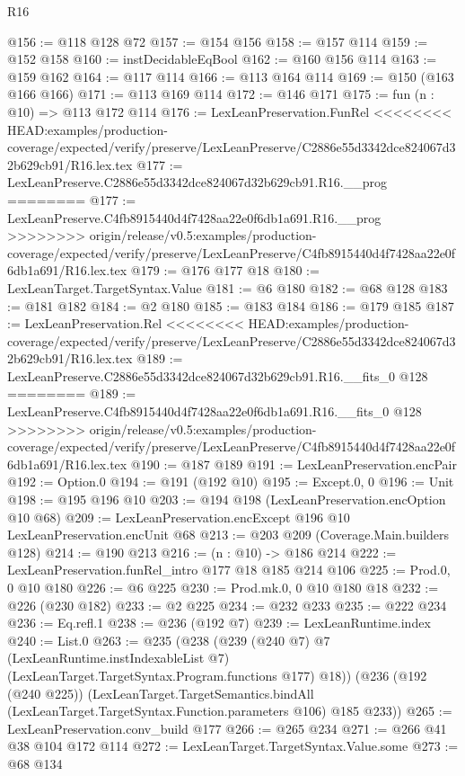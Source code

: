 \begin{lexlean}{R16}
\begin{coremodule}
{{{{{@156 := @118 @128 @72
@157 := @154 @156
@158 := @157 @114
@159 := @152 @158
@160 := instDecidableEqBool
@162 := @160 @156 @114
@163 := @159 @162
@164 := @117 @114
@166 := @113 @164 @114
@169 := @150 (@163 @166 @166)
@171 := @113 @169 @114
@172 := @146 @171
@175 := fun (n : @10) => @113 @172 @114
@176 := LexLeanPreservation.FunRel
<<<<<<<< HEAD:examples/production-coverage/expected/verify/preserve/LexLeanPreserve/C2886e55d3342dce824067d32b629cb91/R16.lex.tex
@177 := LexLeanPreserve.C2886e55d3342dce824067d32b629cb91.R16.__prog
========
@177 := LexLeanPreserve.C4fb8915440d4f7428aa22e0f6db1a691.R16.__prog
>>>>>>>> origin/release/v0.5:examples/production-coverage/expected/verify/preserve/LexLeanPreserve/C4fb8915440d4f7428aa22e0f6db1a691/R16.lex.tex
@179 := @176 @177 @18
@180 := LexLeanTarget.TargetSyntax.Value
@181 := @6 @180
@182 := @68 @128
@183 := @181 @182
@184 := @2 @180
@185 := @183 @184
@186 := @179 @185
@187 := LexLeanPreservation.Rel
<<<<<<<< HEAD:examples/production-coverage/expected/verify/preserve/LexLeanPreserve/C2886e55d3342dce824067d32b629cb91/R16.lex.tex
@189 := LexLeanPreserve.C2886e55d3342dce824067d32b629cb91.R16.__fits_0 @128
========
@189 := LexLeanPreserve.C4fb8915440d4f7428aa22e0f6db1a691.R16.__fits_0 @128
>>>>>>>> origin/release/v0.5:examples/production-coverage/expected/verify/preserve/LexLeanPreserve/C4fb8915440d4f7428aa22e0f6db1a691/R16.lex.tex
@190 := @187 @189
@191 := LexLeanPreservation.encPair
@192 := Option.{0}
@194 := @191 (@192 @10)
@195 := Except.{0, 0}
@196 := Unit
@198 := @195 @196 @10
@203 := @194 @198 (LexLeanPreservation.encOption @10 @68)
@209 := LexLeanPreservation.encExcept @196 @10 LexLeanPreservation.encUnit @68
@213 := @203 @209 (Coverage.Main.builders @128)
@214 := @190 @213
@216 := (n : @10) -> @186 @214
@222 := LexLeanPreservation.funRel_intro @177 @18 @185 @214 @106
@225 := Prod.{0, 0} @10 @180
@226 := @6 @225
@230 := Prod.mk.{0, 0} @10 @180 @18
@232 := @226 (@230 @182)
@233 := @2 @225
@234 := @232 @233
@235 := @222 @234
@236 := Eq.refl.{1}
@238 := @236 (@192 @7)
@239 := LexLeanRuntime.index
@240 := List.{0}
@263 := @235
    (@238
      (@239
        (@240 @7)
        @7
        (LexLeanRuntime.instIndexableList @7)
        (LexLeanTarget.TargetSyntax.Program.functions @177)
        @18))
    (@236
      (@192 (@240 @225))
      (LexLeanTarget.TargetSemantics.bindAll
        (LexLeanTarget.TargetSyntax.Function.parameters @106)
        @185
        @233))
@265 := LexLeanPreservation.conv_build @177
@266 := @265 @234
@271 := @266 @41 @38 @104 @172 @114
@272 := LexLeanTarget.TargetSyntax.Value.some
@273 := @68 @134
}}}}}
\end{coremodule}
\end{lexlean}
